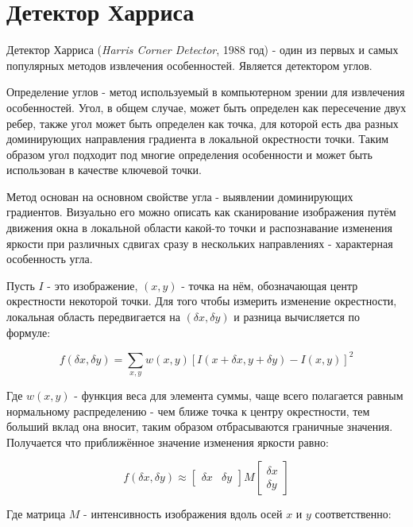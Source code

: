 \section{Детектор Харриса}

Детектор Харриса (\textit{Harris Corner Detector}, 1988 год) - один из первых и самых популярных методов извлечения особенностей. Является детектором углов.

Определение углов - метод используемый в компьютерном зрении для извлечения особенностей. Угол, в общем случае, может быть определен как пересечение двух ребер, также угол может быть определен как точка, для которой есть два разных доминирующих направления градиента в локальной окрестности точки. Таким образом угол подходит под многие определения особенности и может быть использован в качестве ключевой точки. 

Метод основан на основном свойстве угла - выявлении доминирующих градиентов. Визуально его можно описать как сканирование изображения путём движения окна в локальной области какой-то точки и распознавание изменения яркости при различных сдвигах сразу в нескольких направлениях - характерная особенность угла.

Пусть $I$ - это изображение, $(x, y)$ - точка на нём, обозначающая центр окрестности некоторой точки. Для того чтобы измерить изменение окрестности, локальная область передвигается на $(\delta x, \delta y)$ и разница вычисляется по формуле:

\begin{equation}
    f(\delta x, \delta y) = \sum_{x, y} w(x, y) [I(x + \delta x, y + \delta y) - I(x, y)]^2
\end{equation}

Где $w(x, y)$ - функция веса для элемента суммы, чаще всего полагается равным нормальному распределению - чем ближе точка к центру окрестности, тем больший вклад она вносит, таким образом отбрасываются граничные значения. Получается что приближённое значение изменения яркости равно:

\begin{equation}
    f(\delta x, \delta y) \approx \begin{bmatrix} \delta x & \delta y \end{bmatrix} M \begin{bmatrix} \delta x \\ \delta y \end{bmatrix}
\end{equation}

Где матрица $M$ - интенсивность изображения вдоль осей $x$ и $y$ соответственно:

